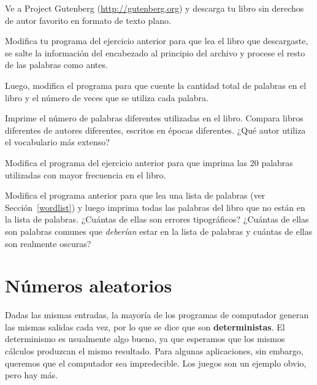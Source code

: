 \documentclass[10pt]{book}
\begin{document}
\begin{exercise}

Ve a Project Gutenberg (\url{http://gutenberg.org}) y descarga
tu libro sin derechos de autor favorito en formato de texto plano.

Modifica tu programa del ejercicio anterior para que lea el libro
que descargaste, se salte la información del encabezado al principio
del archivo y procese el resto de las palabras como antes.

Luego, modifica el programa para que cuente la cantidad total de palabras en
el libro y el número de veces que se utiliza cada palabra.

Imprime el número de palabras diferentes utilizadas en el libro.  Compara
libros diferentes de autores diferentes, escritos en épocas diferentes.
¿Qué autor utiliza el vocabulario más extenso?
\end{exercise}


\begin{exercise}

Modifica el programa del ejercicio anterior para que imprima las
20 palabras utilizadas con mayor frecuencia en el libro.

\end{exercise}


\begin{exercise}

Modifica el programa anterior para que lea una lista de palabras (ver
Sección~\ref{wordlist}) y luego imprima todas las palabras del libro que
no están en la lista de palabras.  ¿Cuántas de ellas son errores tipográficos?
¿Cuántas de ellas son palabras comunes que {\em deberían} estar en la lista
de palabras y cuántas de ellas son realmente oscuras?

\end{exercise}


\section{Números aleatorios}

Dadas las mismas entradas, la mayoría de los programas de computador generan
las mismas salidas cada vez, por lo que se dice que son {\bf deterministas}.
El determinismo es usualmente algo bueno, ya que esperamos que los mismos
cálculos produzcan el mismo resultado.  Para algunas aplicaciones, sin embargo,
queremos que el computador sea impredecible.  Los juegos son un ejemplo
obvio, pero hay más.
\end{document}
